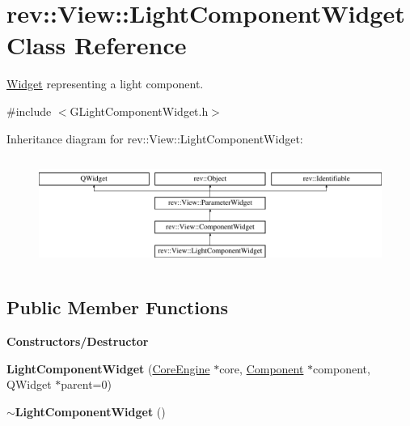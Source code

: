\hypertarget{classrev_1_1_view_1_1_light_component_widget}{}\section{rev\+::View\+::Light\+Component\+Widget Class Reference}
\label{classrev_1_1_view_1_1_light_component_widget}


\mbox{\hyperlink{class_widget}{Widget}} representing a light component.  




{\ttfamily \#include $<$G\+Light\+Component\+Widget.\+h$>$}

Inheritance diagram for rev\+::View\+::Light\+Component\+Widget\+:\begin{figure}[H]
\begin{center}
\leavevmode
\includegraphics[height=3.607085cm]{classrev_1_1_view_1_1_light_component_widget}
\end{center}
\end{figure}
\subsection*{Public Member Functions}
\begin{Indent}\textbf{ Constructors/\+Destructor}\par
\begin{DoxyCompactItemize}
\item 
\mbox{\label{classrev_1_1_view_1_1_light_component_widget_aa829328ed3a073027ea7349dc94f3a49}} 
{\bfseries Light\+Component\+Widget} (\mbox{\hyperlink{classrev_1_1_core_engine}{Core\+Engine}} $\ast$core, \mbox{\hyperlink{classrev_1_1_component}{Component}} $\ast$component, Q\+Widget $\ast$parent=0)
\item 
\mbox{\label{classrev_1_1_view_1_1_light_component_widget_ab2cc8f318b7218dee548b9f043dc780b}} 
{\bfseries $\sim$\+Light\+Component\+Widget} ()
\end{DoxyCompactItemize}
\end{Indent}

